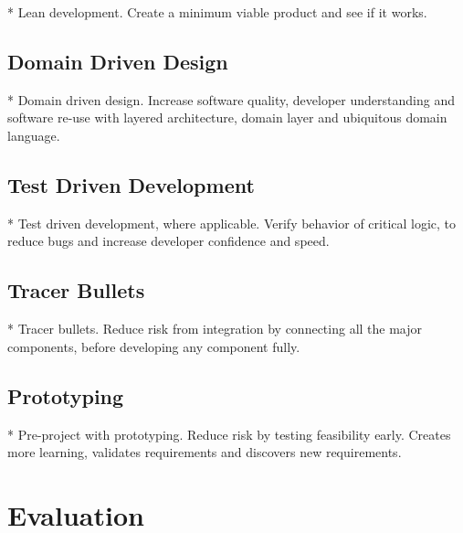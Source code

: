 * Lean development. Create a minimum viable product and see if it works.

\subsection{Domain Driven Design}

* Domain driven design. Increase software quality, developer understanding and software re-use with layered architecture, domain layer and ubiquitous domain language.

\subsection{Test Driven Development}

* Test driven development, where applicable. Verify behavior of critical logic, to reduce bugs and increase developer confidence and speed.

\subsection{Tracer Bullets}
* Tracer bullets. Reduce risk from integration by connecting all the major components, before developing any component fully.

\subsection{Prototyping}

* Pre-project with prototyping. Reduce risk by testing feasibility early. Creates more learning, validates requirements and discovers new requirements.


\section{Evaluation}


